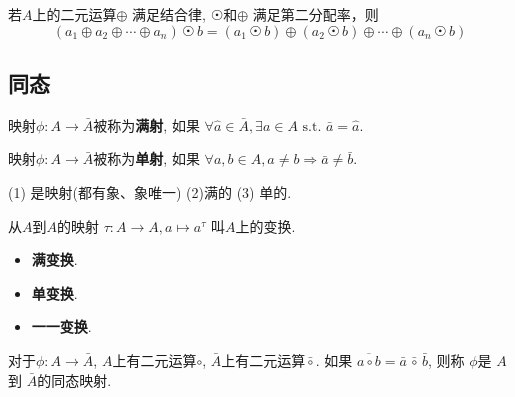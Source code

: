 \begin{Theorem}
若$A$上的二元运算$\oplus$ 满足结合律, $ \astrosun $和$\oplus $ 满足第二分配率，则
$$
( a_1 \oplus a_2 \oplus \cdots \oplus a_n ) \, \astrosun \, b =  ( a_1 \, \astrosun \, b) \oplus ( a_2 \, \astrosun \, b) \oplus \cdots \oplus (  a_n \, \astrosun \, b)
$$
\end{Theorem}

\subsection{同态}

\begin{Definition}[满射]
映射$\phi: A \rightarrow \bar{A}$被称为\textbf{满射}, 如果
$\forall \hat{a} \in \bar{A}, \exists a \in A \text{ s.t. } \bar{a} = \hat{a}$. 
\end{Definition}

\begin{Definition}[单射]
映射$\phi: A \rightarrow \bar{A}$被称为\textbf{单射}, 如果
$\forall a, b \in A, a \neq b \Rightarrow \bar{a} \neq \bar{b}$.
\end{Definition}

\begin{Definition}[一一映射]
{\color{gray}{
既是满射又是单射.
}}
\end{Definition}

\begin{Note}[一一映射判别]
(1) 是映射(都有象、象唯一) (2)满的 (3) 单的.
\end{Note}

\begin{Definition}[变换]
从$A$到$A$的映射 $\tau: A \rightarrow A, a \mapsto a^{\tau}$ 叫$A$上的变换. 
\begin{itemize}
	\item {\color{gray}{如果$\tau$是满的, 则称为}}\textbf{满变换}.
	\item {\color{gray}{如果$\tau$是单的, 则称为}}\textbf{单变换}.
	\item {\color{gray}{如果$\tau$是一一的, 则称为}}\textbf{一一变换}.
\end{itemize}
\end{Definition}

\begin{Definition}[同态映射]
对于$\phi: A \rightarrow \bar{A}$, $A$上有二元运算$\circ$, $\bar{A}$上有二元运算$\bar{\circ}$.
如果
$ \overline{a \circ b} = \bar{a} \, \bar{\circ} \, \bar{b}$, 则称 $\phi$是 $A$到 $\bar{A}$的同态映射.
\end{Definition}

